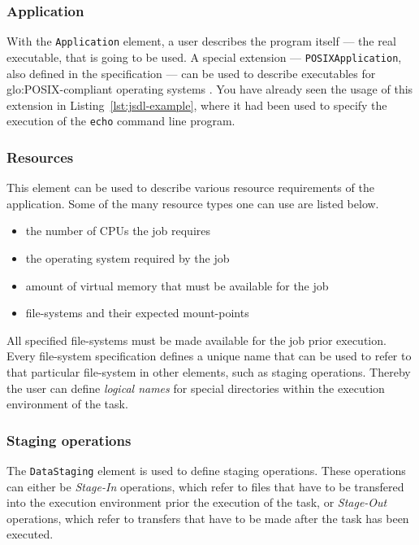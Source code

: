 \subsubsection{Application}

With the \texttt{Application} element, a user describes the program itself
---  \ie the  real executable,  that  is going  to  be  used.  A  special
extension --- \texttt{POSIXApplication}, also defined in the specification
\cite{jsdl-spec}   ---   can  be   used   to   describe  executables   for
\gls{glo:POSIX}-compliant   operating  systems  \cite{posix}.    You  have
already      seen     the     usage      of     this      extension     in
Listing~\ref{lst:jsdl-example},  where it  had  been used  to specify  the
execution of the \texttt{echo} command line program.

\subsubsection{Resources}

This element can be used  to describe various resource requirements of the
application. Some of the many resource types one can use are listed below.

\begin{itemize}
\item the number of CPUs the job requires
\item the operating system required by the job
\item amount of virtual memory that must be available for the job
\item file-systems  and their expected  mount-points
\end{itemize}

All  specified file-systems  must  be  made available  for  the job  prior
execution. Every file-system specification  defines a unique name that can
be used to refer to that particular file-system in other elements, such as
staging operations.  Thereby the  user can define \emph{logical names} for
special directories within the execution environment of the task.
  
\subsubsection{Staging operations}

The   \texttt{DataStaging}    element   is   used    to   define   staging
operations.  These operations  can either  be  \emph{Stage-In} operations,
which  refer  to files  that  have to  be  transfered  into the  execution
environment  prior   the  execution  of  the   task,  or  \emph{Stage-Out}
operations, which refer  to transfers that have to be  made after the task
has been executed.

